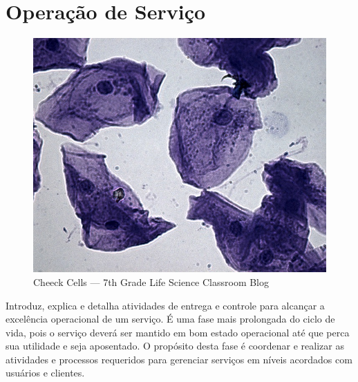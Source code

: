 %
%
%
%


\chapter{Operação de Serviço}
\label{cha:opera}


\begin{figure}
    \centering
    \includegraphics[width=1\textwidth]{img/cheek_cells}\\
    {\scriptsize Cheeck Cells --- 7th Grade Life Science Classroom Blog}
\end{figure}

Introduz, explica e detalha atividades de entrega e controle para alcançar a
excelência operacional de um serviço. É uma fase mais prolongada do ciclo de
vida, pois o serviço deverá ser mantido em bom estado operacional até que perca
sua utilidade e seja aposentado. O propósito desta fase é coordenar e realizar
as atividades e processos requeridos para gerenciar serviços em níveis
acordados com usuários e clientes.


